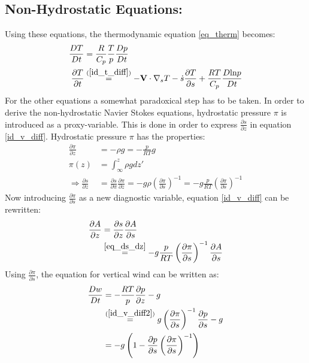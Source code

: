 \subsection{Non-Hydrostatic Equations:}
Using these equations, the thermodynamic equation \ref{eq_therm} becomes:
\begin{align*}
\frac{DT}{Dt} &= \frac{R}{C_p}\frac{T}{p}\frac{Dp}{Dt}\\
\frac{\partial T}{\partial t} &\stackrel{(\ref{id_t_diff})}{=} -\textbf{V} \cdot \nabla _s T - \dot{s} \frac{\partial T}{\partial s}+\frac{RT}{C_p}\frac{D\text{ln}p}{Dt}
\end{align*}
For the other equations a somewhat paradoxical step has to be taken.
In order to derive the non-hydrostatic Navier Stokes equations, hydrostatic pressure $\pi$ is introduced as a proxy-variable.
This is done in order to express $\frac{\partial s}{\partial z}$ in equation \ref{id_v_diff}.
Hydrostatic pressure $\pi$ has the properties:
\begin{align}
\frac{\partial \pi}{\partial z} &= -\rho g = - \frac{p}{RT}g \nonumber \\
\pi(z) &= \int_\infty ^z \rho g dz' \nonumber \\
\Rightarrow \frac{\partial s}{\partial z} &= \frac{\partial s}{\partial \pi}\frac{\partial \pi}{\partial z} = - g\rho\left(\frac{\partial \pi}{\partial s}\right)^{-1} = - g\frac{p}{RT}\left(\frac{\partial \pi}{\partial s}\right)^{-1} \label{eq_ds_dz}
\end{align}
Now introducing $\frac{\partial \pi}{\partial s}$ as a new diagnostic variable, equation \ref{id_v_diff} can be rewritten:
\begin{align}
\frac{\partial A}{\partial z} &= \frac{\partial s}{\partial z} \frac{\partial A}{\partial s}\nonumber\\
&\stackrel{\ref{eq_ds_dz}}{=} - g\frac{p}{RT}\left(\frac{\partial \pi}{\partial s}\right)^{-1}\frac{\partial A}{\partial s}\label{id_v_diff2}
\end{align}
Using $\frac{\partial \pi}{\partial s}$, the equation for vertical wind can be written as:
\begin{align*}
\frac{Dw}{Dt} &= - \frac{RT}{p} \frac{\partial p}{\partial z} - g\\
&\stackrel{(\ref{id_v_diff2})}{=} g \left(\frac{\partial \pi}{\partial s}\right)^{-1}\frac{\partial p}{\partial s} - g\\
&= -g\left(1 - \frac{\partial p}{\partial s}\left(\frac{\partial \pi}{\partial s}\right)^{-1}\right)
\end{align*}
